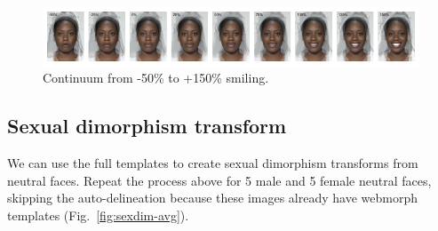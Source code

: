 \documentclass[
  man,floatsintext]{apa6}
\begin{document}
\begin{figure}
\includegraphics[width=1\linewidth]{index_files/figure-latex/continuum-1} \caption{Continuum from -50\% to +150\% smiling.}\label{fig:continuum}
\end{figure}

\hypertarget{sexual-dimorphism-transform}{%
\subsection{Sexual dimorphism transform}\label{sexual-dimorphism-transform}}

We can use the full templates to create sexual dimorphism transforms from neutral faces. Repeat the process above for 5 male and 5 female neutral faces, skipping the auto-delineation because these images already have webmorph templates (Fig.~\ref{fig:sexdim-avg}).
\end{document}
